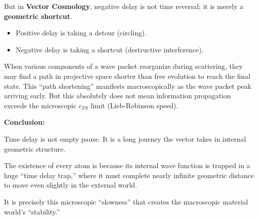 But in \textbf{Vector Cosmology}, negative delay is not time reversal; it is merely a \textbf{geometric shortcut}.

\begin{itemize}
\item Positive delay is taking a detour (circling).

\item Negative delay is taking a shortcut (destructive interference).
\end{itemize}

When various components of a wave packet reorganize during scattering, they may find a path in projective space shorter than free evolution to reach the final state. This ``path shortening'' manifests macroscopically as the wave packet peak arriving early. But this absolutely does not mean information propagation exceeds the microscopic $c_{FS}$ limit (Lieb-Robinson speed).

\textbf{Conclusion:}

Time delay is not empty pause. It is a long journey the vector takes in internal geometric structure.

The existence of every atom is because its internal wave function is trapped in a huge ``time delay trap,'' where it must complete nearly infinite geometric distance to move even slightly in the external world.

It is precisely this microscopic ``slowness'' that creates the macroscopic material world's ``stability.''

